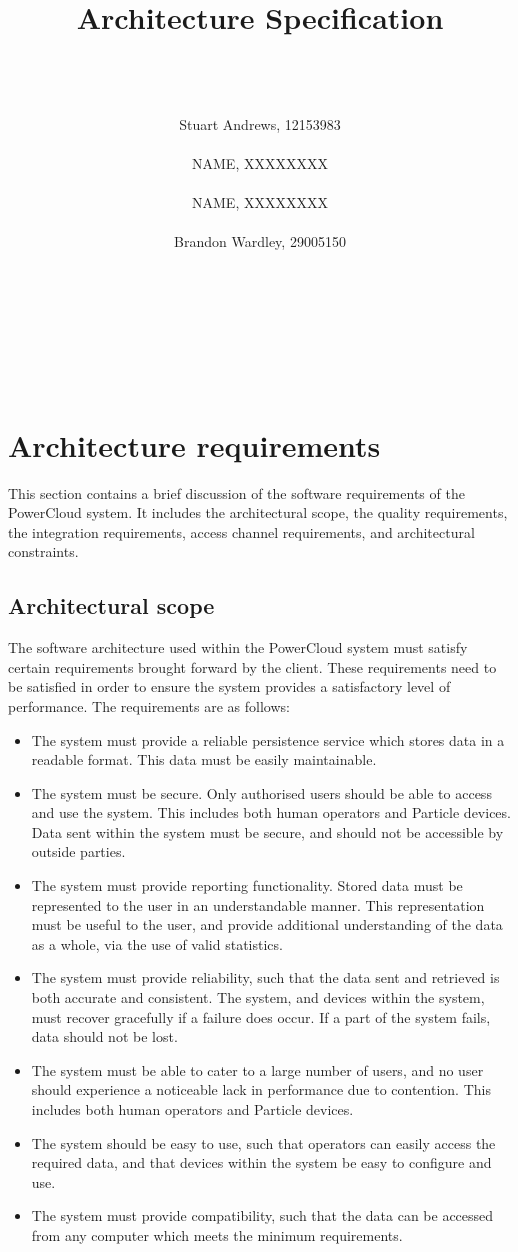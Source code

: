 \documentclass{article}
\title{Architecture Specification}
\author
{  
	\\\\\\
	Stuart Andrews, 12153983 
	\\\\
	NAME, XXXXXXXX
	\\\\
	NAME, XXXXXXXX 
	\\\\
	Brandon Wardley, 29005150 
	\\\\\\\\\\\\\\
}
\begin{document}
\maketitle
\thispagestyle{empty}
\newpage
\tableofcontents

\newpage

\section{Architecture requirements}

This section contains a brief discussion of the software requirements of 
the PowerCloud system. It includes the architectural scope, the quality 
requirements, the integration requirements, access channel requirements, 
and architectural constraints.

	\subsection{Architectural scope}
	
	The software architecture used within the PowerCloud system must 
	satisfy certain requirements brought forward by the client. These 
	requirements need to be satisfied in order to ensure the system 
	provides a satisfactory level of performance. The requirements are as 
	follows:

	\begin{itemize}
		\item The system must provide a reliable persistence service 
		which stores data in a readable format. This data must be easily 
		maintainable.
		\item The system must be secure. Only authorised users should be 
		able to access and use the system. This includes both human 
		operators and Particle devices. Data sent within the system must 
		be secure, and should not be accessible by outside parties.
		\item The system must provide reporting functionality. Stored 
		data must be represented to the user in an understandable manner. 
		This representation must be useful to the user, and provide 
		additional understanding of the data as a whole, via the use of 
		valid statistics.
		\item The system must provide reliability, such that the data 
		sent and retrieved is both accurate and consistent. The system, 
		and devices within the system, must recover gracefully if a 
		failure does occur. If a part of the system fails, data should 
		not be lost.
		\item The system must be able to cater to a large number of 
		users, and no user should experience a noticeable lack in 
		performance due to contention. This includes both human operators 
		and Particle devices.
		\item The system should be easy to use, such that operators can 
		easily access the required data, and that devices within the 
		system be easy to configure and use.
		\item The system must provide compatibility, such that the data 
		can be accessed from any computer which meets the minimum 
		requirements.
	\end{itemize}
	
\end{document}
